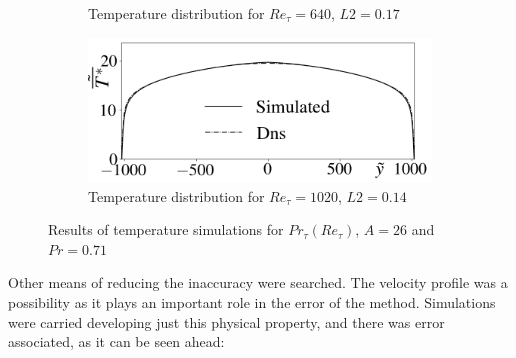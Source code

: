 \documentclass[10pt]{article} %
\begin{document}
\begin{figure}[!h]
\begin{subfigure}[t]{0.5\textwidth}
		\caption{Temperature distribution for $Re_\tau = 640$, $L2 = 0.17$}
	\end{subfigure}
	\begin{subfigure}[t]{0.45\textwidth}
		\centering
		\includegraphics[angle=0, scale=0.24]{fotos_formatacao_final/Temperature_1000_071_Prt(Ret)_A26}
		\caption{Temperature distribution for $Re_\tau = 1020$, $L2 = 0.14$}
	\end{subfigure}	
	\caption{Results of temperature simulations for $Pr_\tau(Re_\tau)$, $A = 26$ and $Pr =0.71$ }
\end{figure}



\newpage

Other means of reducing the inaccuracy were searched. The velocity profile was a possibility as it plays an important role in the error of the method. Simulations were carried developing just this physical property, and there was error associated, as it can be seen ahead:
\end{document}
